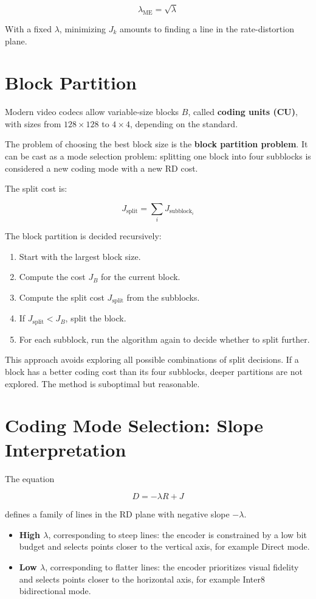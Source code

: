 \[
\lambda_{\text{ME}} = \sqrt{\lambda}
\]

With a fixed $\lambda$, minimizing $J_k$ amounts to finding a line in the rate-distortion plane.

\section{Block Partition}

Modern video codecs allow variable-size blocks $B$, called \textbf{coding units (CU)}, with sizes from $128 \times 128$ to $4 \times 4$, depending on the standard.

The problem of choosing the best block size is the \textbf{block partition problem}. It can be cast as a mode selection problem: splitting one block into four subblocks is considered a new coding mode with a new RD cost.

The split cost is:

\[
J_{\text{split}} = \sum_i J_{\text{subblock}_i}
\]

The block partition is decided recursively:

\begin{enumerate}
\item Start with the largest block size.
\item Compute the cost $J_B$ for the current block.
\item Compute the split cost $J_{\text{split}}$ from the subblocks.
\item If $J_{\text{split}} < J_B$, split the block.
\item For each subblock, run the algorithm again to decide whether to split further.
\end{enumerate}

This approach avoids exploring all possible combinations of split decisions. If a block has a better coding cost than its four subblocks, deeper partitions are not explored. The method is suboptimal but reasonable.

\section{Coding Mode Selection: Slope Interpretation}

The equation

\[
D = -\lambda R + J
\]

defines a family of lines in the RD plane with negative slope $-\lambda$.

\begin{itemize}
\item \textbf{High $\lambda$}, corresponding to steep lines: the encoder is constrained by a low bit budget and selects points closer to the vertical axis, for example Direct mode.
\item \textbf{Low $\lambda$}, corresponding to flatter lines: the encoder prioritizes visual fidelity and selects points closer to the horizontal axis, for example Inter8 bidirectional mode.
\end{itemize}

